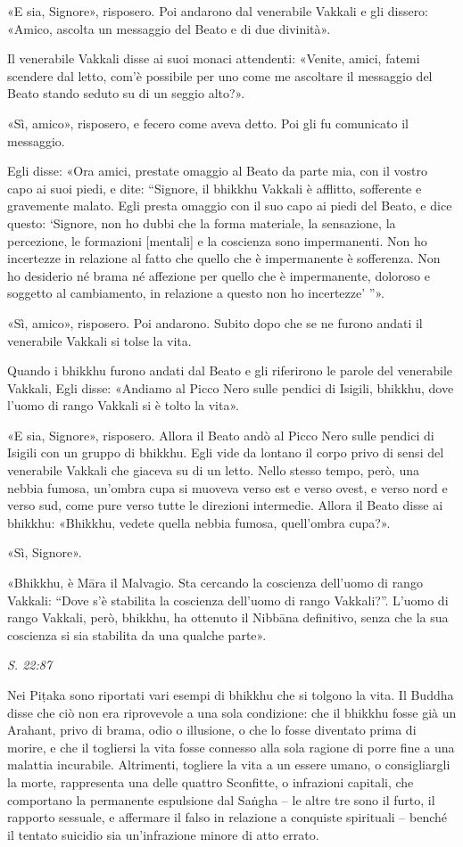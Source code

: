«E sia, Signore», risposero. Poi andarono dal venerabile Vakkali e gli
dissero: «Amico, ascolta un messaggio del Beato e di due divinità».


Il venerabile Vakkali disse ai suoi monaci attendenti: «Venite, amici,
fatemi scendere dal letto, com’è possibile per uno come me ascoltare il
messaggio del Beato stando seduto su di un seggio alto?».


«Sì, amico», risposero, e fecero come aveva detto. Poi gli fu comunicato
il messaggio.


Egli disse: «Ora amici, prestate omaggio al Beato da parte mia, con il
vostro capo ai suoi piedi, e dite: “Signore, il bhikkhu Vakkali è
afflitto, sofferente e gravemente malato. Egli presta omaggio con il suo
capo ai piedi del Beato, e dice questo: ‘Signore, non ho dubbi che la
forma materiale, la sensazione, la percezione, le formazioni [mentali] e
la coscienza sono impermanenti. Non ho incertezze in relazione al fatto
che quello che è impermanente è sofferenza. Non ho desiderio né brama né
affezione per quello che è impermanente, doloroso e soggetto al
cambiamento, in relazione a questo non ho incertezze’ ”».


«Sì, amico», risposero. Poi andarono. Subito dopo che se ne furono
andati il venerabile Vakkali si tolse la vita.


Quando i bhikkhu furono andati dal Beato e gli riferirono le parole del
venerabile Vakkali, Egli disse: «Andiamo al Picco Nero sulle pendici di
Isigili, bhikkhu, dove l’uomo di rango Vakkali si è tolto la vita».


«E sia, Signore», risposero. Allora il Beato andò al Picco Nero sulle
pendici di Isigili con un gruppo di bhikkhu. Egli vide da lontano il
corpo privo di sensi del venerabile Vakkali che giaceva su di un letto.
Nello stesso tempo, però, una nebbia fumosa, un’ombra cupa si muoveva
verso est e verso ovest, e verso nord e verso sud, come pure verso tutte
le direzioni intermedie. Allora il Beato disse ai bhikkhu: «Bhikkhu,
vedete quella nebbia fumosa, quell’ombra cupa?».


«Sì, Signore».


«Bhikkhu, è Māra il Malvagio. Sta cercando la coscienza dell’uomo di
rango Vakkali: “Dove s’è stabilita la coscienza dell’uomo di rango
Vakkali?”. L’uomo di rango Vakkali, però, bhikkhu, ha ottenuto il
Nibbāna definitivo, senza che la sua coscienza si sia stabilita da una
qualche parte».


\emph{S. 22:87}


 Nei Piṭaka sono riportati vari esempi di bhikkhu che si
tolgono la vita. Il Buddha disse che ciò non era riprovevole a una sola
condizione: che il bhikkhu fosse già un Arahant, privo di brama, odio o
illusione, o che lo fosse diventato prima di morire, e che il togliersi
la vita fosse connesso alla sola ragione di porre fine a una malattia
incurabile. Altrimenti, togliere la vita a un essere umano, o
consigliargli la morte, rappresenta una delle quattro Sconfitte, o
infrazioni capitali, che comportano la permanente espulsione dal Saṅgha
– le altre tre sono il furto, il rapporto sessuale, e affermare il falso
in relazione a conquiste spirituali – benché il tentato suicidio sia
un’infrazione minore di atto errato.


